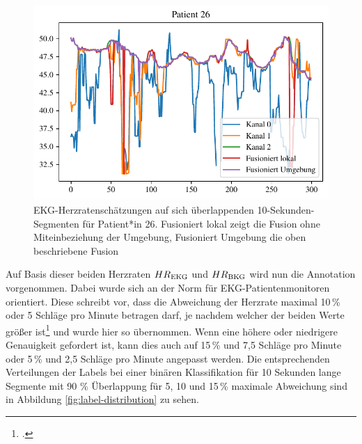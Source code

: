	\begin{figure}[H]%
		\centering
		\includegraphics{pic/ecg-patient-26.pdf}
		\caption[\ac{EKG}-Herzratenschätzungen auf sich überlappenden 10-Sekunden-Segmenten für Patient*in 26]{\ac{EKG}-Herzratenschätzungen auf sich überlappenden 10-Sekunden-Segmenten für Patient*in 26. Fusioniert lokal zeigt die Fusion ohne Miteinbeziehung der Umgebung, Fusioniert Umgebung die oben beschriebene Fusion}
		\label{fig:ecg-patient-26}
	\end{figure}


	Auf Basis dieser beiden Herzraten $HR\textsubscript{EKG}$ und $HR\textsubscript{BKG}$ wird nun die Annotation vorgenommen. Dabei wurde sich an der Norm für \ac{EKG}-Patientenmonitoren orientiert. Diese schreibt vor, dass die Abweichung der Herzrate maximal 10\,\% oder 5 Schläge pro Minute betragen darf, je nachdem welcher der beiden Werte größer ist\footcite[]{DIN} und wurde hier so übernommen. Wenn eine höhere oder niedrigere Genauigkeit gefordert ist, kann dies auch auf 15\,\% und 7{,}5 Schläge pro Minute oder 5\,\% und 2{,}5 Schläge pro Minute angepasst werden. Die entsprechenden Verteilungen der Labels bei einer binären Klassifikation für 10 Sekunden lange Segmente mit 90 \% Überlappung für 5, 10 und 15\,\% maximale Abweichung sind in Abbildung \ref{fig:label-distribution} zu sehen.
	
